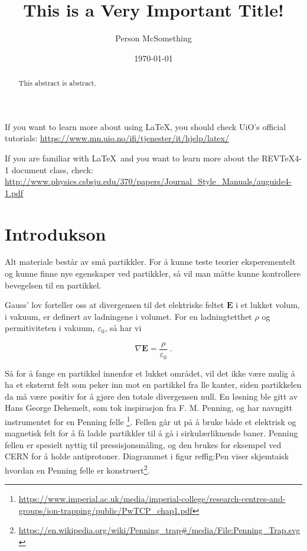 \documentclass[reprint,english,notitlepage, nofootinbib]{revtex4-1}  %
\begin{document}
\title{This is a Very Important Title!}   %
\author{Person McSomething}               %
\date{\today}                             %
\noaffiliation                            %
\begin{abstract}                          %
This abstract is abstract.                %
\end{abstract}                            %
\maketitle                                %

If you want to learn more about using \LaTeX, you should check UiO's official tutorials:
\url{https://www.mn.uio.no/ifi/tjenester/it/hjelp/latex/}

If you are familiar with \LaTeX\ and you want to learn more about the REVTeX4-1 document class, check:
\url{http://www.physics.csbsju.edu/370/papers/Journal_Style_Manuals/auguide4-1.pdf}


\section{Introdukson}

Alt materiale består av små partikkler. For å kunne teste teorier eksperementelt og kunne finne nye egenskaper ved partikkler, så vil man måtte kunne kontrollere bevegelsen til en partikkel. 

Gauss' lov forteller oss at divergensen til det elektriske feltet $\mathbf{E}$ i et lukket volum, i vakuum, er definert av ladningene i volumet. For en ladningtetthet $\rho$ og permitiviteten i vakuum, $\varepsilon_0$, så har vi

\begin{equation}
\label{gauss}
\nabla{\mathbf{E}} = \frac{\rho}{\varepsilon_0} \; .
\end{equation} 

Så for å fange en partikkel innenfor et lukket området, vil det ikke være mulig å ha et eksternt felt som peker inn mot en partikkel fra lle kanter, siden partikkelen da må være positiv for å gjøre den totale divergensen null. En løsning ble gitt av Hans George Dehemelt, som tok inspirasjon fra F. M. Penning, og har navngitt instrumentet for en Penning felle \footnote{\url{https://www.imperial.ac.uk/media/imperial-college/research-centres-and-groups/ion-trapping/public/PwTCP_chap1.pdf}}. Fellen går ut på å bruke både et elektrisk og magnetisk felt for å få ladde partikkler til å gå i sirkulærliknende baner. Penning fellen er spesielt nyttig til pressisjonsmåling, og den brukes for eksempel ved CERN for å holde antiprotoner. Diagrammet i figur ref{fig:Pen} viser skjemtaisk hvordan en Penning felle er konstruert\footnote{\url{https://en.wikipedia.org/wiki/Penning_trap\#/media/File:Penning_Trap.svg}}. 
\end{document}

